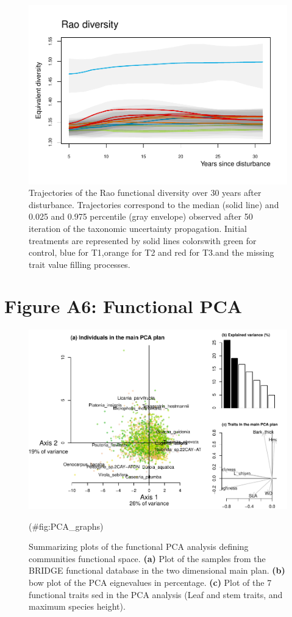 \documentclass[fleqn,10pt]{ArtEcoFoG} %
\begin{document}
\begin{figure}

{\centering \includegraphics[width=0.6\linewidth]{AppendixI_files/figure-latex/DivFun-1} 

}

\caption{Trajectories of the Rao functional diversity over 30 years after disturbance. Trajectories correspond to the median (solid line) and 0.025 and 0.975 percentile (gray envelope) observed after 50 iteration of the taxonomic uncertainty propagation. Initial treatments are represented by solid lines colorswith green for control, blue for T1,orange for T2 and red for T3.and the missing trait value filling processes.}\label{fig:DivFun}
\end{figure}

\section{\texorpdfstring{\textbf{Figure A6}: Functional
PCA}{Figure A6: Functional PCA}}\label{figure-a6-functional-pca}

\begin{figure}

{\centering \includegraphics[width=1\linewidth]{AppendixI_files/figure-latex/PCA_graphs-1} 

}

\caption{Summarizing plots of the functional PCA analysis defining communities functional space. \textbf{(a)} Plot of the samples from the BRIDGE functional database in the two dimensional main plan. \textbf{(b)} bow plot of the PCA eignevalues in percentage. \textbf{(c)} Plot of the 7 functional traits sed in the PCA analysis (Leaf and stem traits, and maximum species height).}(\#fig:PCA_graphs)
\end{figure}
\end{document}
